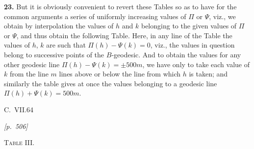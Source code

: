 \documentclass[11pt]{article}
\begin{document}
\medskip

\textbf{23.} But it is obviously convenient to revert these Tables so as
to have for the common arguments a series of uniformly increasing values
of $\Pi$ or $\Psi$, viz., we obtain by interpolation the values of $h$
and $k$ belonging to the given values of $\Pi$ or $\Psi$, and thus
obtain the following Table. Here, in any line of the Table the values
of $h$, $k$ are such that $\Pi(h)-\Psi(k)=0$, viz., the values in
question belong to successive points of the $B$-geodesic. And to obtain
the values for any other geodesic line $\Pi(h)-\Psi(k)=\pm 500m$, we
have only to take each value of $k$ from the line $m$ lines above or
below the line from which $h$ is taken; and similarly the table gives
at once the values belonging to a geodesic line $\Pi(h)+\Psi(k)=500m$.

\medskip

\hfill C.\ VII.\hfill 64

\newpage

\noindent\textit{[p.~506]}

\medskip

\begin{center}\textsc{Table III.}\end{center}

\medskip
\end{document}
